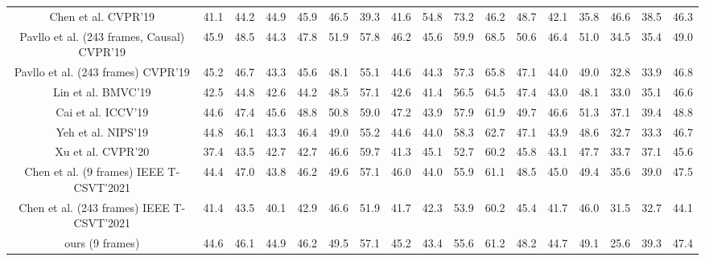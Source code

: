 \documentclass[journal]{IEEEtran}
\begin{document}
\begin{table*}[t]
{{\begin{tabular}{|ccccccccccccccccc|}
			Chen et al.  \cite{2019weakly} CVPR’19           & 41.1 & 44.2  & 44.9 & 45.9  & 46.5  & 39.3  & 41.6 & 54.8   & 73.2 & 46.2  & 48.7  & 42.1 & 35.8   & 46.6 & 38.5   & 46.3 \\
			Pavllo et al. \cite{20183D} (243 frames, Causal) CVPR’19 & 45.9          & 48.5          & 44.3          & 47.8          & 51.9          & 57.8          & 46.2          & 45.6          & 59.9          & 68.5          & 50.6          & 46.4          & 51.0          & 34.5          & 35.4          & 49.0          \\
			Pavllo et al.  \cite{20183D} (243  frames) CVPR’19         & 45.2 & 46.7  & 43.3 & 45.6  & 48.1  & 55.1  & 44.6 & 44.3   & 57.3 & 65.8  & 47.1  & 44.0 & 49.0   & 32.8 & 33.9   & 46.8 \\
			Lin et al.  \cite{2019Lin} BMVC’19            & 42.5 & 44.8  & 42.6 & 44.2  & 48.5  & 57.1  & 42.6 & 41.4   & 56.5 & 64.5  & 47.4  & 43.0 & 48.1   & 33.0 & 35.1   & 46.6 \\
			Cai et al.  \cite{9009459} ICCV’19            & 44.6 & 47.4  & 45.6 & 48.8  & 50.8  & 59.0  & 47.2 & 43.9   & 57.9 & 61.9  & 49.7  & 46.6 & 51.3   & 37.1 & 39.4   & 48.8 \\
			Yeh et al.  \cite{2019Yeh} NIPS’19            & 44.8 & 46.1  & 43.3 & 46.4  & 49.0  & 55.2  & 44.6 & 44.0   & 58.3 & 62.7  & 47.1  & 43.9 & 48.6   & 32.7 & 33.3   & 46.7 \\
			Xu et al. \cite{2020Deep} CVPR’20                              & 37.4          & 43.5          & 42.7          & 42.7          & 46.6          & 59.7          & 41.3          & 45.1          & 52.7          & 60.2          & 45.8          & 43.1          & 47.7          & 33.7          & 37.1          & 45.6          \\
			Chen et al.  \cite{2020Anatomy} (9 frames) IEEE T-CSVT'2021 & 44.4 & 47.0  & 43.8 & 46.2  & 49.6  & 57.1  & 46.0 & 44.0   & 55.9 & 61.1  & 48.5  & 45.0 & 49.4   & 35.6 & 39.0   & 47.5 \\ 
			Chen et al. \cite{2020Anatomy} (243 frames) IEEE T-CSVT'2021 & 41.4          & 43.5          & 40.1          & 42.9          & 46.6          & 51.9          & 41.7          & 42.3          & 53.9          & 60.2          & 45.4          & 41.7          & 46.0          & 31.5          & 32.7          & 44.1          \\
			\hline
			ours (9 frames)    & 44.6          & 46.1          & 44.9          & 46.2          & 49.5          & 57.1          & 45.2          & 43.4          & 55.6         & 61.2          & 48.2          & 44.7          & 49.1          & 25.6          & 39.3          & 47.4          \\

\end{tabular}}}
\end{table*}
\end{document}

